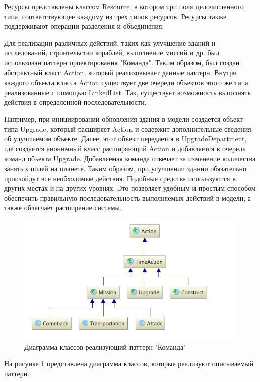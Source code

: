 Ресурсы представлены классом Resource, в котором три поля целочисленного типа, соответствующее каждому из трех типов ресурсов. Ресурсы также поддерживают операции разделения и объединения.

Для реализации различных действий, таких как улучшение зданий и исследований, строительство кораблей, выполнение миссий и др. был использован паттерн проектирования "Команда". Таким образом, был создан абстрактный класс Action, который реализовывает данные паттерн. Внутри каждого объекта класса Action существует две очереди объектов этого же типа реализованные с помощью LinkedList. Так, существует возможность выполнять действия в определенной последовательности. 

Например, при инициировании обновления здания в модели создается объект типа Upgrade, который расширяет Action и содержит дополнительные сведения об улучшаемом объекте. Далее, этот объект передается в UpgradeDepartment, где создается анонимный класс расширяющий Action и добавляется в очередь команд объекта Upgrade. Добавляемая команда отвечает за изменение количества занятых полей на планете. Таким образом, при улучшении здании обязательно произойдут все необходимые действия. Подобные средства используются в других местах и на других уровнях. Это позволяет удобным и простым способом обеспечить правильную последовательность выполняемых действий в модели, а также облегчает расширение системы. 

\begin{figure}[H]
\centering
\includegraphics[scale=0.5]{d3.png}
\caption{Диаграмма классов  реализующий паттерн "Команда"}
\label{pic:d3}
\end{figure}

На рисунке \ref{pic:d3} представлена диаграмма классов, которые реализуют описываемый паттерн.


